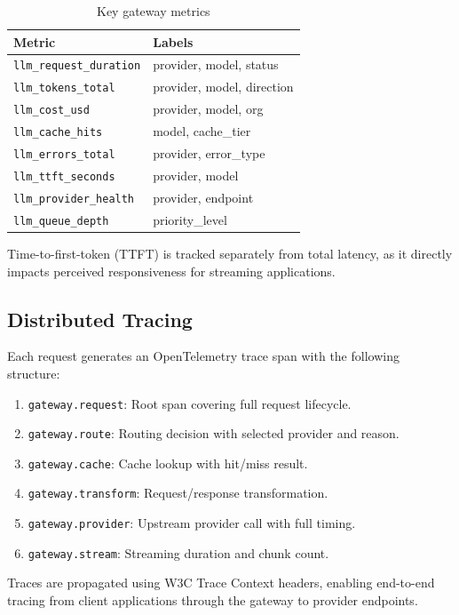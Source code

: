 \documentclass[11pt,twocolumn]{article}
\begin{document}
\begin{table}[t]
\centering
\caption{Key gateway metrics}
\label{tab:metrics}
\begin{tabular}{@{}ll@{}}
\toprule
\textbf{Metric} & \textbf{Labels} \\
\midrule
\texttt{llm\_request\_duration} & provider, model, status \\
\texttt{llm\_tokens\_total} & provider, model, direction \\
\texttt{llm\_cost\_usd} & provider, model, org \\
\texttt{llm\_cache\_hits} & model, cache\_tier \\
\texttt{llm\_errors\_total} & provider, error\_type \\
\texttt{llm\_ttft\_seconds} & provider, model \\
\texttt{llm\_provider\_health} & provider, endpoint \\
\texttt{llm\_queue\_depth} & priority\_level \\
\bottomrule
\end{tabular}
\end{table}

Time-to-first-token (TTFT) is tracked separately from total latency, as it directly impacts perceived responsiveness for streaming applications.

\subsection{Distributed Tracing}

Each request generates an OpenTelemetry trace span with the following structure:

\begin{enumerate}[leftmargin=*]
    \item \texttt{gateway.request}: Root span covering full request lifecycle.
    \item \texttt{gateway.route}: Routing decision with selected provider and reason.
    \item \texttt{gateway.cache}: Cache lookup with hit/miss result.
    \item \texttt{gateway.transform}: Request/response transformation.
    \item \texttt{gateway.provider}: Upstream provider call with full timing.
    \item \texttt{gateway.stream}: Streaming duration and chunk count.
\end{enumerate}

Traces are propagated using W3C Trace Context headers, enabling end-to-end tracing from client applications through the gateway to provider endpoints.
\end{document}
